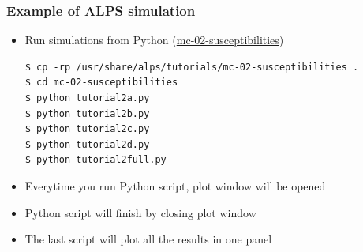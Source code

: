 

\begin{frame}[t,fragile]
  \frametitle{Example of ALPS simulation}
  \begin{itemize}
    \item Run simulations from Python (\href{http://alps.comp-phys.org/mediawiki/index.php/ALPS_2_Tutorials:MC-02_Susceptibilities}{mc-02-susceptibilities})
\begin{lstlisting}
$ cp -rp /usr/share/alps/tutorials/mc-02-susceptibilities .
$ cd mc-02-susceptibilities  
$ python tutorial2a.py
$ python tutorial2b.py
$ python tutorial2c.py
$ python tutorial2d.py
$ python tutorial2full.py
\end{lstlisting}
    \item Everytime you run Python script, plot window will be opened
    \item Python script will finish by closing plot window
    \item The last script will plot all the results in one panel
  \end{itemize}
\end{frame}

